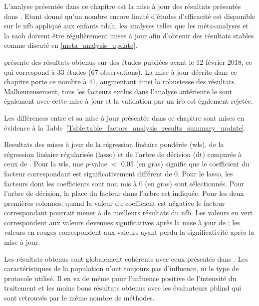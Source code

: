 L'analyse présentée dans ce chapitre est la mise à jour des résultats présentés dans \citet{Bussalb2019clinical}. Etant donné qu'un nombre encore limité d'études
d'efficacité est disponible sur le \gls{nfb} appliqué aux enfants \gls{tdah}, les analyses telles que les méta-analyses et la \gls{saob} doivent être régulièrement mises
à jour afin d'obtenir des résultats stables comme discuté en \ref{meta_analysis_update}.

\citet{Bussalb2019clinical} présente des résultats obtenus sur des études publiées avant le 12 février 2018, ce qui correspond à 33 études (67 observations). La mise 
à jour décrite dans ce chapitre porte ce nombre à 41, augmentant ainsi la robustesse des
résultats. Malheureusement, tous les facteurs exclus dans l'analyse antérieure le sont également avec cette mise à jour et la validation par
un \gls{irb} est également rejetée.

Les différences entre \citet{Bussalb2019clinical} et sa mise à jour présentée dans ce chapitre sont mises en évidence à la 
Table~\ref{Table:table_factors_analysis_results_summary_update}.

\begin{table}[h!]
  \centering
  \caption{Resultats des mises à jour de la régression linéaire pondérée (\gls{wls}), de la régression linéaire régularisée (\gls{lasso}) et de l'arbre de décision (\gls{dt})
	comparés à ceux de \citet{Bussalb2019clinical}. Pour la \gls{wls}, une $p$-value $<$ 0.05 
	(en gras) signifie que le coefficient du facteur correspondant est significativement différent de 0. Pour le \gls{lasso}, les facteurs dont les coefficients sont non mis à 0 (en gras) sont 
	sélectionnés. Pour l'arbre de décision, la place du facteur dans l'arbre est indiquée. Pour les deux premières colonnes, quand la valeur du coefficient est négative le facteur 
	correspondant pourrait mener à de meilleurs résultats du \gls{nfb}. Les valeurs en vert correspondent aux valeurs devenues significatives après la mise à jour de \citet{Bussalb2019clinical}; les valeurs
	en rouges correspondent aux valeurs ayant perdu la significativité après la mise à jour.}
  
  \label{Table:table_factors_analysis_results_summary_update}
\end{table}

Les résultats obtenus sont globalement cohérents avec ceux présentés dans \citet{Bussalb2019clinical}. Les caractéristiques de la population n'ont toujours pas d'influence, ni
le type de protocole utilisé. Il en va de même pour l'influence positive de l'intensité du traitement et les moins bons résultats obtenus avec les évaluateurs \gls{pblind} qui sont
retrouvés par le même nombre de méthodes. 


